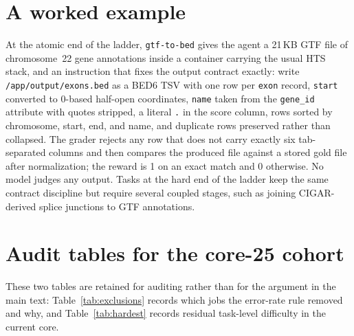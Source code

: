 \documentclass[11pt]{article}
\begin{document}
\section{A worked example}
\label{app:example}

At the atomic end of the ladder, \texttt{gtf-to-bed} gives the agent a 21\,KB GTF file of chromosome~22 gene annotations inside a container carrying the usual HTS stack, and an instruction that fixes the output contract exactly: write \texttt{/app/output/exons.bed} as a BED6 TSV with one row per \texttt{exon} record, \texttt{start} converted to 0-based half-open coordinates, \texttt{name} taken from the \texttt{gene\_id} attribute with quotes stripped, a literal \texttt{.} in the score column, rows sorted by chromosome, start, end, and name, and duplicate rows preserved rather than collapsed.
The grader rejects any row that does not carry exactly six tab-separated columns and then compares the produced file against a stored gold file after normalization; the reward is 1 on an exact match and 0 otherwise.
No model judges any output.
Tasks at the hard end of the ladder keep the same contract discipline but require several coupled stages, such as joining CIGAR-derived splice junctions to GTF annotations.

\section{Audit tables for the core-25 cohort}
\label{app:audit}

These two tables are retained for auditing rather than for the argument in the main text: Table~\ref{tab:exclusions} records which jobs the error-rate rule removed and why, and Table~\ref{tab:hardest} records residual task-level difficulty in the current core.

\begin{table}[h]
\centering
\small
\caption{Excluded OpenRouter jobs. These are not counted as scientific failures because the trial artefacts do not support normal benchmark interpretation under the error-rate policy.}
\label{tab:exclusions}

\end{table}

\begin{table}[h]
\centering
\small
\caption{Hardest tasks in the current clean OpenRouter cohort. ``Disc.'' is an item-discrimination statistic computed against the model-level pass@4 totals on the remaining tasks.}
\label{tab:hardest}

\end{table}
\end{document}
